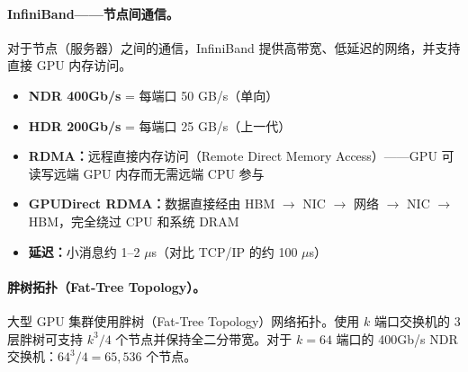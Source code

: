 \paragraph{InfiniBand——节点间通信。}
\label{infiniband-inter-node-communication.}

对于节点（服务器）之间的通信，InfiniBand 提供高带宽、低延迟的网络，并支持直接 GPU 内存访问。

\begin{keybox}
\begin{itemize}
  \item \textbf{NDR 400Gb/s} = 每端口 50 GB/s（单向）
  \item \textbf{HDR 200Gb/s} = 每端口 25 GB/s（上一代）
  \item \textbf{RDMA：}远程直接内存访问（Remote Direct Memory Access）——GPU 可读写远端 GPU 内存而无需远端 CPU 参与
  \item \textbf{GPUDirect RDMA：}数据直接经由 HBM $\to$ NIC $\to$ 网络 $\to$ NIC $\to$ HBM，完全绕过 CPU 和系统 DRAM
  \item \textbf{延迟：}小消息约 1--2 $\mu$s（对比 TCP/IP 的约 100 $\mu$s）
\end{itemize}
\end{keybox}

\paragraph{胖树拓扑（Fat-Tree Topology）。}
\label{fat-tree-topology.}

大型 GPU 集群使用胖树（Fat-Tree Topology）网络拓扑。使用 $k$ 端口交换机的 3 层胖树可支持 $k^3/4$ 个节点并保持全二分带宽。对于 $k=64$ 端口的 400Gb/s NDR 交换机：$64^3/4 = 65{,}536$ 个节点。


